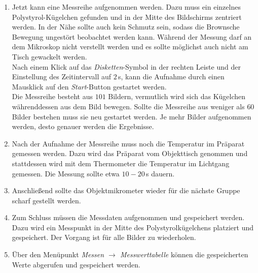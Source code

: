 \begin{enumerate}
  \item Jetzt kann eine Messreihe aufgenommen werden. Dazu muss ein einzelnes Polystyrol-Kügelchen gefunden und in der Mitte des Bildschirms zentriert werden. In der Nähe sollte auch kein Schmutz sein, sodass die Brownsche Bewegung ungestört beobachtet werden kann. Während der Messung darf an dem Mikroskop nicht verstellt werden und es sollte möglichst auch nicht am Tisch gewackelt werden.\\
  Nach einem Klick auf das \emph{Disketten}-Symbol in der rechten Leiste und der Einstellung des Zeitintervall  auf $2 \,$s, kann die Aufnahme durch einen Mausklick auf den \emph{Start}-Button gestartet werden.\\
  Die Messreihe besteht aus $101$ Bildern, vermutlich wird sich das Kügelchen währenddessen aus dem Bild bewegen. Sollte die Messreihe aus weniger als $60$ Bilder bestehen muss sie neu gestartet werden. Je mehr Bilder aufgenommen werden, desto genauer werden die Ergebnisse.

  \item Nach der Aufnahme der Messreihe muss noch die Temperatur im Präparat gemessen werden. Dazu wird das Präparat vom Objekttisch genommen und stattdessen wird mit dem Thermometer die Temperatur im Lichtgang gemessen. Die Messung sollte etwa $10 - 20\,$s dauern.

  \item Anschließend sollte das Objektmikrometer wieder für die nächste Gruppe scharf gestellt werden.

  \item Zum Schluss müssen die Messdaten aufgenommen und gespeichert werden.
  Dazu wird ein Messpunkt in der Mitte des Polystyrolkügelchens platziert und gespeichert. Der Vorgang ist für alle Bilder zu wiederholen.

  \item Über den Menüpunkt \emph{Messen $\rightarrow$ Messwerttabelle} können die gespeicherten Werte abgerufen und gespeichert werden.

\end{enumerate}
